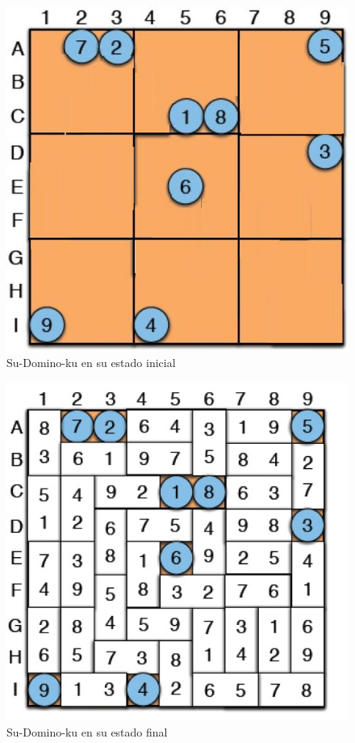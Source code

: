 \documentclass[twocolumn]{article}
\begin{document}
\begin{figure}[H]
	\centering
	\includegraphics[scale=0.4]{Domino1.jpg}
	\caption{Su-Domino-ku en su estado inicial}
	\label{fig:inicial}
\end{figure}

\begin{figure}[H]
	\centering
	\includegraphics[scale=0.4]{Domino2.jpg}
	\caption{Su-Domino-ku en su estado final}
	\label{fig:final}
\end{figure}
\end{document}
